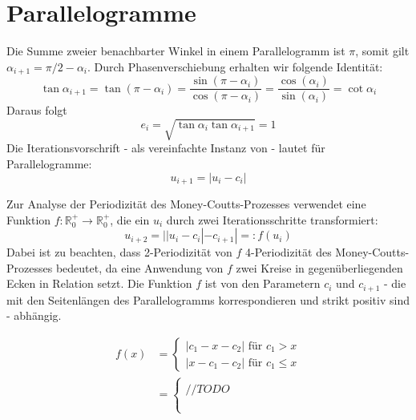 \chapter{Parallelogramme}

Die Summe zweier benachbarter Winkel in einem Parallelogramm ist $\pi$,
somit gilt $\alpha_{i+1} = \pi/2 - \alpha_i$.
Durch Phasenverschiebung erhalten wir folgende Identität:
\begin{equation*}
    \tan\alpha_{i+1}  = \tan(\pi - \alpha_i)
    = \frac{\sin(\pi - \alpha_i)}{\cos(\pi - \alpha_i)}
    = \frac{\cos(\alpha_i)}{\sin(\alpha_i)}
    = \cot\alpha_i
\end{equation*}
Daraus folgt
\begin{equation*}
    e_i = \sqrt{\tan\alpha_i \tan \alpha_{i+1}} = 1
\end{equation*}
Die Iterationsvorschrift - als vereinfachte Instanz von  - lautet für Parallelogramme:
\begin{equation*}
    u_{i+1}=|u_i - c_i|
\end{equation*}

Zur Analyse der Periodizität des Money-Coutts-Prozesses verwendet \citet{Troub2000}
eine Funktion $f:\mathbb{R}_0^+ \to \mathbb{R}_0^+$, die ein $u_i$ durch zwei Iterationsschritte transformiert:
\begin{equation*}
    u_{i+2}=||u_i-c_i|-c_{i+1}| =: f(u_i)
\end{equation*}
Dabei ist zu beachten, dass 2-Periodizität von $f$ 4-Periodizität des Money-Coutts-Prozesses bedeutet,
da eine Anwendung von $f$ zwei Kreise in gegenüberliegenden Ecken in Relation setzt.
Die Funktion $f$ ist von den Parametern $c_i$ und $c_{i+1}$ - die mit den Seitenlängen des Parallelogramms korrespondieren und strikt positiv sind - abhängig.

\begin{align}
    f(x) & = \begin{cases}
                 |c_1-x-c_2| \text{ für } c_1 > x \\
                 |x-c_1-c_2| \text{ für } c_1 \leq x
             \end{cases} \\
         & =\begin{cases}
                \\ // TODO
                \\
                \\
                \\
            \end{cases}
    \label{parallelogram:cases}
\end{align}

